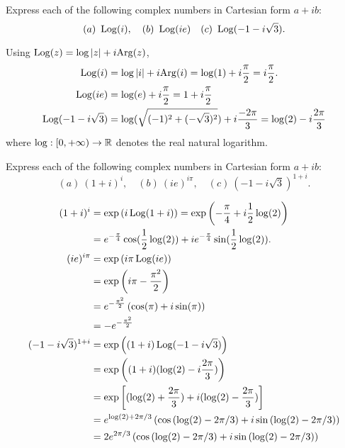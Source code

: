 

\begin{questions}
\question Express each of the following complex numbers in Cartesian form $a+ib$:
\[
(a)\ \operatorname{Log} (i), \quad (b)\ \operatorname{Log} (ie)\quad (c)\  \operatorname{Log} (-1-i\sqrt{3}).
\]
\begin{answer}
Using $\operatorname{Log} (z) = \log \left| z \right| + i \mathrm{Arg} (z)$,
\begin{align*}
\operatorname{Log}(i) & = \log \left| i \right| + i \mathrm{Arg} (i) = \log(1)+i\frac{\pi}{2} = i\frac{\pi}{2}.\\
\operatorname{Log} (ie) &= \log(e)+i\frac{\pi}{2}  = 1 + i \frac{\pi}{2} \\
 \operatorname{Log} (-1-i\sqrt{3}) & =  \log (\sqrt{(-1)^2+(-\sqrt{3})^2}) + i \frac{-2\pi}{3}  = \log(2)-i \frac{2\pi}{3} 
\end{align*}
where $\log:[0,+\infty) \to \mathbb{R}$ denotes the real natural logarithm.
\end{answer}

\question Express each of the following complex numbers in Cartesian form $a+ib$:
\[
 (a)\ (1+i)^i, \quad (b)\ (ie)^{i\pi}, \quad (c)\ (-1-i\sqrt{3})^{1+i}.
\]
\begin{answer}
\begin{align*}
(1+i)^i & = \exp \left( i \operatorname{Log} (1+i) \right) = \exp \left( -\frac{\pi}{4} + i \frac{1}{2} \log(2) \right) \\
& = e^{-\frac{\pi}{4}} \cos ( \frac{1}{2} \log (2) ) + i e^{-\frac{\pi}{4}} \sin ( \frac{1}{2} \log (2) ). \\
(ie)^{i\pi} & = \exp \left( i \pi \operatorname{Log} (ie) \right) \\
& = \exp \left( i\pi - \frac{\pi^2}{2} \right) \\
& = e^{-\frac{\pi^2}{2}} \left( \cos(\pi)+i \sin (\pi) \right) \\
& = -e^{-\frac{\pi^2}{2}} \\
(-1-i \sqrt{3} )^{1+i} & = \exp \left( (1+i) \operatorname{Log} (-1-i \sqrt{3} ) \right) \\
& = \exp \left( (1+i) ( \log (2) - i \frac{2\pi}{3} ) \right) \\
& = \exp \left[ (\log(2)+\frac{2\pi}{3} )+i ( \log(2)- \frac{2\pi}{3}) \right] \\
& = e^{\log(2) + 2\pi/3} \left( \cos \left( \log(2)-2\pi/3 \right) + i \sin \left( \log(2)-2\pi/3 \right) \right) \\
& = 2 e^{2\pi/3} \left( \cos \left( \log(2)-2\pi/3 \right) + i \sin \left( \log(2)-2\pi/3 \right) \right) 
\end{align*}
\end{answer}
\question 
\begin{parts}

\end{parts}
\end{questions}
